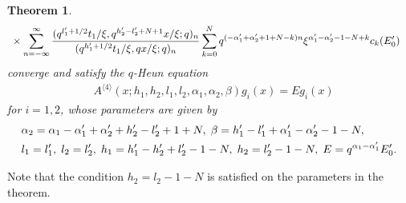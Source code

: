 \documentclass[12pt]{amsart}
\numberwithin{equation}{section}
\newtheorem{thm}{Theorem}[section]
\theoremstyle{definition}
\theoremstyle{remark}
\begin{document}
\begin{thm}
\begin{align}
      &\; \times \sum_{n = -\infty}^{\infty} \frac{(q^{l_{1}' + 1/2}t_{1}/\xi, q^{h_{2}' - l_{2}' + N + 1}x/\xi; q)_{n}}{(q^{h_{1}' + 1/2}t_{1}/\xi, qx/\xi; q)_{n}}  \sum_{k = 0}^{N} q^{(-\alpha_{1}' + \alpha_{2}' + 1 + N -k )n} \xi^{\alpha_{1}' - \alpha_{2}' - 1 - N + k}  c_{k} (E'_0 ) \notag
    \end{align}
converge and satisfy the $q$-Heun equation
\begin{align*}
& A^{\langle 4 \rangle} (x; h_{1}, h_{2}, l_{1}, l_{2}, \alpha_{1}, \alpha_{2}, \beta) g_i (x) = E g _i (x) 
\end{align*}
for $i=1,2$, whose parameters are given by
\begin{align}
& \alpha_{2} = \alpha_{1} - \alpha_{1}' + \alpha_{2}' + h_{2}' - l_{2}' + 1 + N , \; \beta = h_{1}' - l_{1}' + \alpha_{1}' - \alpha_{2}' - 1 - N, \label{eq:1param} \\
& l_{1} = l_{1}' , \; l_{2} = l_{2}', \;  h_{1} = h_{1}' -h_{2}' + l_{2}' - 1 - N, \; h_{2} = l_{2}' - 1 - N, \; E = q^{\alpha_{1} - \alpha_{1}'}E_{0}' . \notag
\end{align}
\end{thm}
Note that the condition $h_{2} = l_{2} - 1 - N$ is satisfied on the parameters in the theorem.
\end{document}
